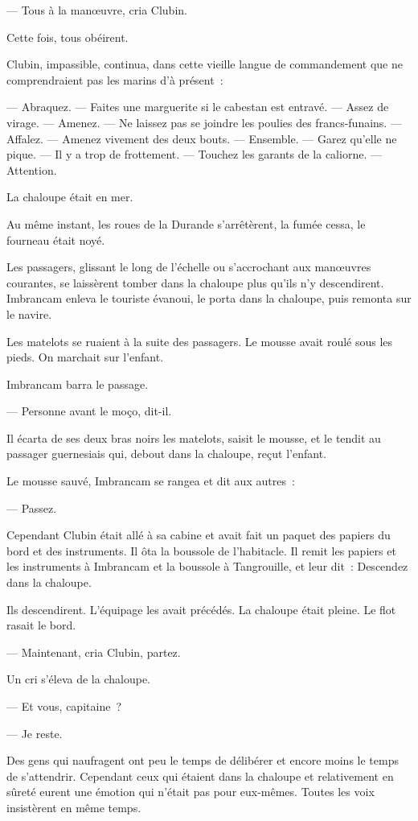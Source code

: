 \documentclass[french,twoside]{book} %
\begin{document}
— Tous à la manœuvre, cria Clubin.\par
Cette fois, tous obéirent.\par
Clubin, impassible, continua, dans cette vieille langue de commandement que ne comprendraient pas les marins d’à présent :\par
— Abraquez. — Faites une marguerite si le cabestan est entravé. — Assez de virage. — Amenez. — Ne laissez pas se joindre les poulies des francs-funains. — Affalez. — Amenez vivement des deux bouts. — Ensemble. — Garez qu’elle ne pique. — Il y a trop de frottement. — Touchez les garants de la caliorne. — Attention.\par
La chaloupe était en mer.\par
Au même instant, les roues de la Durande s’arrêtèrent, la fumée cessa, le fourneau était noyé.\par
Les passagers, glissant le long de l’échelle ou s’accrochant aux manœuvres courantes, se laissèrent tomber dans la chaloupe plus qu’ils n’y descendirent. Imbrancam enleva le touriste évanoui, le porta dans la chaloupe, puis remonta sur le navire.\par
Les matelots se ruaient à la suite des passagers. Le mousse avait roulé sous les pieds. On marchait sur l’enfant.\par
 Imbrancam barra le passage.\par
— Personne avant le moço, dit-il.\par
Il écarta de ses deux bras noirs les matelots, saisit le mousse, et le tendit au passager guernesiais qui, debout dans la chaloupe, reçut l’enfant.\par
Le mousse sauvé, Imbrancam se rangea et dit aux autres :\par
— Passez.\par
Cependant Clubin était allé à sa cabine et avait fait un paquet des papiers du bord et des instruments. Il ôta la boussole de l’habitacle. Il remit les papiers et les instruments à Imbrancam et la boussole à Tangrouille, et leur dit : Descendez dans la chaloupe.\par
Ils descendirent. L’équipage les avait précédés. La chaloupe était pleine. Le flot rasait le bord.\par
— Maintenant, cria Clubin, partez.\par
Un cri s’éleva de la chaloupe.\par
— Et vous, capitaine ?\par
— Je reste.\par
Des gens qui naufragent ont peu le temps de délibérer et encore moins le temps de s’attendrir. Cependant ceux qui étaient dans la chaloupe et relativement en sûreté eurent une émotion qui n’était pas pour eux-mêmes. Toutes les voix insistèrent en même temps.\par
\end{document}
